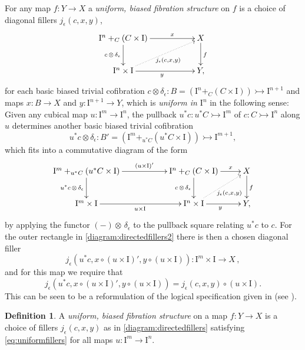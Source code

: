 \documentclass[11pt]{amsart}
\newcommand{\mono}{\ensuremath{\rightarrowtail}}
\newcommand{\ra}{\ensuremath{\rightarrow}}
\newcommand{\I}{\ensuremath{\mathrm{I}}}
\newtheorem{corollary}[theorem]{Corollary}
\theoremstyle{remark}
\theoremstyle{definition}
\newtheorem{definition}[theorem]{Definition}
\begin{document}
For any map $f:Y\ra X$  a \emph{uniform, biased fibration structure} on $f$ is a choice of diagonal fillers $j_\epsilon(c,x,y)$,
\begin{equation}\label{diagram:directedfillers}
\xymatrix{
\I^n +_C (C\times\I) \ar[d]_{c\,\otimes\,\delta_\epsilon} \ar[rr]^-{x} && X \ar[d]^f \\
\I^{n}\times \I \ar@{.>}[rru]_{j_\epsilon(c,x,y)} \ar[rr]_y && Y,
}
\end{equation}
for each basic biased trivial cofibration $c \otimes \delta_\epsilon : B = (\I^n +_C (C\times\I)) \mono \I^{n+1}$ and maps $x : B\ra X$ and $y : \I^{n+1}\ra Y$, which is \emph{uniform in $\I^{n}$} in the following sense: Given any cubical map $u : \I^m \ra \I^n$, the pullback $u^*c : u^*C\mono \I^m$ of $c : C\mono \I^n$ along $u$ determines another basic biased trivial cofibration $$u^*c \otimes \delta_\epsilon : B' = (\I^m +_{u^*C} (u^*C\times\I)) \mono \I^{m+1},$$ which fits into a commutative diagram of the form
\begin{equation}\label{diagram:directedfillers2}
\xymatrix{
\I^m +_{u^*C} (u^*C\times\I) \ar[d]_{u^*c\,\otimes\,\delta_\epsilon} \ar[rr]^-{(u\times\I)'} && \I^n +_C (C\times\I) \ar[d]_{c\,\otimes\,\delta_\epsilon} \ar[r]^-{x} & X \ar[d]^f \\
\I^{m}\times \I  \ar[rr]_{u\times \I} && \I^{n}\times \I \ar@{.>}[ru]_{j_\epsilon(c,x,y)} \ar[r]_{y} & Y,
}
\end{equation}
by applying the functor $(-)\otimes\,\delta_\epsilon$ to the pullback square relating $u^*c$ to $c$.  For the outer rectangle in \eqref{diagram:directedfillers2} there is then a chosen diagonal filler $$j_\epsilon(u^*c,x\circ(u\times\I)', y\circ(u\times\I)): \I^m\times\I\ra X\,,$$ and for this map we require that
\begin{equation}\label{eq:uniformfillers}
j_\epsilon(u^*c,x\circ (u\times\I)', y\circ(u\times\I)) = j_\epsilon(c,x,y)\circ(u\times \I).
\end{equation}
This can be seen to be a reformulation of the logical specification given in \cite{CCHM} (see \cite{AGH}).

\begin{definition}\label{def:uniform} A \emph{uniform, biased fibration structure} on a map $f: Y\ra X$ is a choice of fillers $j_\epsilon(c,x,y)$ as in \eqref{diagram:directedfillers} satisfying \eqref{eq:uniformfillers} for all maps $u : \I^m\ra\I^n$.
\end{definition}

\end{document}
